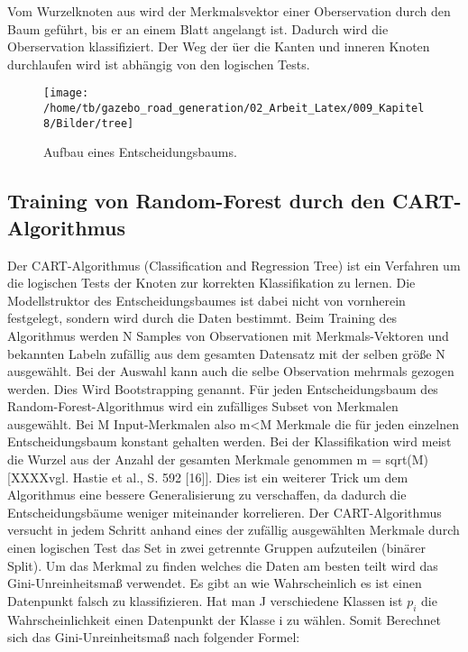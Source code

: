 Vom Wurzelknoten aus wird der Merkmalsvektor einer Oberservation durch den Baum gef{\"u}hrt, bis er an einem Blatt angelangt ist. Dadurch wird die Oberservation klassifiziert.
Der Weg der {\"u}er die Kanten und inneren Knoten durchlaufen wird ist abh{\"a}ngig von den logischen Tests.



\begin{figure}[H]
\begin{center}
  \texttt{[image: /home/tb/gazebo\_road\_generation/02\_Arbeit\_Latex/009\_Kapitel8/Bilder/tree]}%
  \caption[Aufbau eines Entscheidungsbaums]%
           {\label{fig:Aufbau eines Entscheidungsbaums}%
           Aufbau eines Entscheidungsbaums.
           }
\end{center}
\end{figure}

\subsection{Training von Random-Forest durch den CART-Algorithmus}
\label{subsec:Training von Random-Forest durch den CART-Algorithmus}

Der CART-Algorithmus (Classification and Regression Tree) ist ein Verfahren um die logischen Tests der Knoten zur korrekten Klassifikation zu lernen. Die Modellstruktor des Entscheidungsbaumes ist dabei nicht von vornherein festgelegt, sondern wird durch die Daten bestimmt. 
Beim Training des Algorithmus werden N Samples von Observationen mit Merkmals-Vektoren und bekannten Labeln zuf{\"a}llig aus dem gesamten Datensatz mit der selben gr{\"o}{\ss}e N ausgew{\"a}hlt. Bei der Auswahl kann auch die selbe Observation mehrmals gezogen werden. Dies Wird  Bootstrapping genannt. 
F{\"u}r jeden Entscheidungsbaum des Random-Forest-Algorithmus wird ein zuf{\"a}lliges Subset von Merkmalen ausgew{\"a}hlt. Bei M Input-Merkmalen also m<M Merkmale die f{\"u}r jeden einzelnen Entscheidungsbaum konstant gehalten werden. Bei der Klassifikation wird meist die Wurzel aus der Anzahl der gesamten Merkmale genommen m = sqrt(M) [XXXXvgl. Hastie et al., S. 592 [16]]. Dies ist ein weiterer Trick um dem Algorithmus eine bessere Generalisierung zu verschaffen, da dadurch die Entscheidungsb{\"a}ume weniger miteinander korrelieren.
Der CART-Algorithmus versucht in jedem Schritt anhand eines der zuf{\"a}llig ausgew{\"a}hlten Merkmale durch einen logischen Test das Set in zwei getrennte Gruppen aufzuteilen (bin{\"a}rer Split). Um das Merkmal zu finden welches die Daten am besten teilt wird das Gini-Unreinheitsma{\ss} verwendet. Es gibt an wie Wahrscheinlich es ist einen Datenpunkt falsch zu klassifizieren.
Hat man J verschiedene Klassen ist  $p_i$ die Wahrscheinlichkeit einen Datenpunkt der Klasse i zu w{\"a}hlen. Somit Berechnet sich das Gini-Unreinheitsma{\ss} nach folgender Formel:


